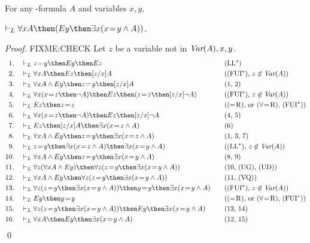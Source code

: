 \documentclass[11pt]{woarticle}
\theoremstyle{break}
\theoremstyle{nonumberplain}
\newcommand{\1}{\;\,|\;\,}
\newcommand{\var}{\emph{Var}}
\newcommand{\T}[1]{\ensuremath{(\mathrm{ #1})}}
\newcommand{\itemT}[1]{\item[\T{#1}]}
\begin{document}
\begin{lemma}
  For any -formula $A$ and variables $x,y$, 
  \begin{semantics}
    \itemT{FUI^{**}} $\vdash_L \forall x A \then (Ey \then \exists
    x(x\!=\!y \land A))$.
  \end{semantics}
\end{lemma}

\begin{proof}
  FIXME:CHECK
  Let $z$ be a variable not in $\var(A),x,y$.
  \begin{alignat*}{2}
    1.\quad & \vdash_L z\!=\!y \then Ey \then Ez &\quad& \text{\T{LL^*}}\\
    2.\quad & \vdash_L \forall x A \then Ez \then [z/x]A
    && \text{(\T{FUI^*}, $z \not\in \var(A)$)}\\
    3.\quad & \vdash_L \forall x A \land Ey \then z\!=\!y \then [z/x]A
    && \text{(1, 2)}\\
    4.\quad & \vdash_L \forall x (x\!=\!z \then \neg A) \then Ez
    \then (z\!=\!z \then [z/x]\neg A) && \text{(\T{FUI^*}, $z \not\in \var(A)$)}\\
    5.\quad & \vdash_L Ez \then z\!=\!z
    && \text{(\T{=\!R}, or \T{\forall\!=\!R}, \T{FUI^*})}\\
    6.\quad & \vdash_L \forall x (x\!=\!z \then \neg A) \then Ez \then
    [z/x]\neg A
    && \text{(4, 5)}\\
    7.\quad & \vdash_L Ez \then [z/x]A \then \exists x(x\!=\!z \land
    A)
    && \text{(6)}\\
    8.\quad & \vdash_L \forall x A \land Ey \then z\!=\!y
    \then \exists x(x\!=\!z \land A) && \text{(1, 3, 7)}\\
    9.\quad & \vdash_L z\!=\!y \then \exists x(x\!=\!z \land A) \then
    \exists x(x\!=\!y \land A) && \text{(\T{LL^*}, $z \not\in \var(A)$)}\\
    10.\quad & \vdash_L \forall x A \land Ey \then z\!=\!y \then
    \exists x(x\!=\!y \land A) && \text{(8, 9)}\\
    11.\quad & \vdash_L \forall z(\forall x A \land Ey) \then \forall
    z (z\!=\!y \then \exists x(x\!=\!y \land A))
    && \text{(10, \T{UG}, \T{UD})}\\
    12.\quad & \vdash_L \forall x A \land Ey \then \forall
    z (z\!=\!y \then \exists x(x\!=\!y \land A)) && \text{(11, \T{VQ})}\\
    13.\quad & \vdash_L \forall z (z\!=\!y \then \exists x(x\!=\!y \land A)) 
    \then y\!=\!y \then \exists x(x\!=\!y \land A)
    && \text{(\T{FUI^*}, $z \not\in \var(A)$)}\\
    14.\quad & \vdash_L Ey \then y\!=\!y 
    && \text{(\T{=\!R}, or \T{\forall\!=\!R}, \T{FUI^*})}\\
    15.\quad & \vdash_L \forall z (z\!=\!y \then \exists x(x\!=\!y \land A))
    \then Ey \then \exists x(x\!=\!y \land A) && \text{(13, 14)}\\
    16.\quad & \vdash_L \forall x A \then Ey \then \exists x(x\!=\!y \land A) 
    && \text{(12, 15)}
  \end{alignat*}
  \qed

\end{proof}
\end{document}
